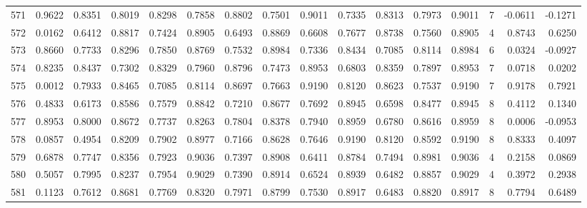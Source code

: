 \begin{tabular}{lrrrrrrrrrrrrrrr}
571 &      0.9622 &  0.8351 &  0.8019 &  0.8298 &  0.7858 &  0.8802 &  0.7501 &  0.9011 &  0.7335 &  0.8313 &   0.7973 &     0.9011 &      7 &                   -0.0611 &                    -0.1271 \\
572 &      0.0162 &  0.6412 &  0.8817 &  0.7424 &  0.8905 &  0.6493 &  0.8869 &  0.6608 &  0.7677 &  0.8738 &   0.7560 &     0.8905 &      4 &                    0.8743 &                     0.6250 \\
573 &      0.8660 &  0.7733 &  0.8296 &  0.7850 &  0.8769 &  0.7532 &  0.8984 &  0.7336 &  0.8434 &  0.7085 &   0.8114 &     0.8984 &      6 &                    0.0324 &                    -0.0927 \\
574 &      0.8235 &  0.8437 &  0.7302 &  0.8329 &  0.7960 &  0.8796 &  0.7473 &  0.8953 &  0.6803 &  0.8359 &   0.7897 &     0.8953 &      7 &                    0.0718 &                     0.0202 \\
575 &      0.0012 &  0.7933 &  0.8465 &  0.7085 &  0.8114 &  0.8697 &  0.7663 &  0.9190 &  0.8120 &  0.8623 &   0.7537 &     0.9190 &      7 &                    0.9178 &                     0.7921 \\
576 &      0.4833 &  0.6173 &  0.8586 &  0.7579 &  0.8842 &  0.7210 &  0.8677 &  0.7692 &  0.8945 &  0.6598 &   0.8477 &     0.8945 &      8 &                    0.4112 &                     0.1340 \\
577 &      0.8953 &  0.8000 &  0.8672 &  0.7737 &  0.8263 &  0.7804 &  0.8378 &  0.7940 &  0.8959 &  0.6780 &   0.8616 &     0.8959 &      8 &                    0.0006 &                    -0.0953 \\
578 &      0.0857 &  0.4954 &  0.8209 &  0.7902 &  0.8977 &  0.7166 &  0.8628 &  0.7646 &  0.9190 &  0.8120 &   0.8592 &     0.9190 &      8 &                    0.8333 &                     0.4097 \\
579 &      0.6878 &  0.7747 &  0.8356 &  0.7923 &  0.9036 &  0.7397 &  0.8908 &  0.6411 &  0.8784 &  0.7494 &   0.8981 &     0.9036 &      4 &                    0.2158 &                     0.0869 \\
580 &      0.5057 &  0.7995 &  0.8237 &  0.7954 &  0.9029 &  0.7390 &  0.8914 &  0.6524 &  0.8939 &  0.6482 &   0.8857 &     0.9029 &      4 &                    0.3972 &                     0.2938 \\
581 &      0.1123 &  0.7612 &  0.8681 &  0.7769 &  0.8320 &  0.7971 &  0.8799 &  0.7530 &  0.8917 &  0.6483 &   0.8820 &     0.8917 &      8 &                    0.7794 &                     0.6489 \\

\end{tabular}
